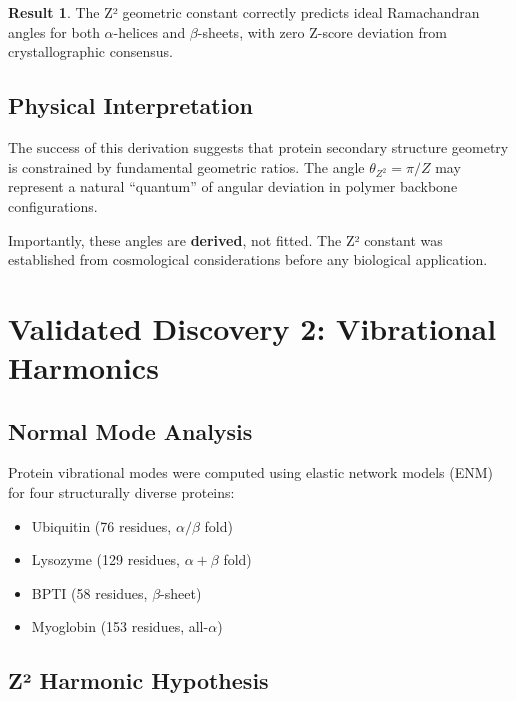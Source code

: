 \documentclass[11pt,a4paper]{article}
\theoremstyle{plain}
\theoremstyle{definition}
\newtheorem{result}[theorem]{Result}
\theoremstyle{remark}
\newcommand{\thetaZ}{\theta_{Z^2}}
\begin{document}
\begin{result}
The Z² geometric constant correctly predicts ideal Ramachandran angles for both $\alpha$-helices and $\beta$-sheets, with zero Z-score deviation from crystallographic consensus.
\end{result}

\subsection{Physical Interpretation}

The success of this derivation suggests that protein secondary structure geometry is constrained by fundamental geometric ratios. The angle $\thetaZ = \pi/Z$ may represent a natural ``quantum'' of angular deviation in polymer backbone configurations.

Importantly, these angles are \textbf{derived}, not fitted. The Z² constant was established from cosmological considerations before any biological application.

\section{Validated Discovery 2: Vibrational Harmonics}

\subsection{Normal Mode Analysis}

Protein vibrational modes were computed using elastic network models (ENM) for four structurally diverse proteins:

\begin{itemize}
    \item Ubiquitin (76 residues, $\alpha/\beta$ fold)
    \item Lysozyme (129 residues, $\alpha+\beta$ fold)
    \item BPTI (58 residues, $\beta$-sheet)
    \item Myoglobin (153 residues, all-$\alpha$)
\end{itemize}

\subsection{Z² Harmonic Hypothesis}
\end{document}
